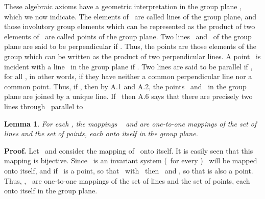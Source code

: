 \documentclass[a4paper,twoside,12pt]{article}
\newtheorem{lemma}{Lemma}[section]
\newenvironment{proof}{\medskip \noindent 
            {\bf Proof.}}{ \hfill \myHighlight{$\square$}\coordHE{} \medskip}
\begin{document}
     These algebraic axioms have a geometric interpretation in the 
group plane \coordHE{}, which we now indicate.
The elements of \coordHE{}\ are called lines of the group plane, and
those involutory group elements which can be represented as the product of
two elements of \coordHE{}\ are called points of the group plane. Two
lines \coordHE{}\ and \coordHE{}\ of the group plane are said to be perpendicular if 
\coordHE{}. Thus, the points are those elements of the group which can 
be written as the product of two perpendicular lines. A point \coordHE{}\ is 
incident with a line \coordHE{}\ in the group plane if \coordHE{}. Two lines 
\coordHE{} are said to be parallel if \coordHE{}, for all \coordHE{},
in other words, if they have neither a common perpendicular line nor a 
common point. Thus, if \coordHE{}, then by A.1 and A.2, the
points \coordHE{}\ and \coordHE{}\ in the group plane are joined by a unique line. If \coordHE{}\ then A.6 says that there are precisely two lines through \coordHE{}\
parallel to \coordHE{}

\begin{lemma} For each \coordHE{}, the mappings 
\myHighlight{$\sigma_{a}:$}\coordHE{}\ \coordHE{} and 
\myHighlight{$\sigma_{\alpha }:P\longmapsto P^{\alpha }\equiv \alpha P\alpha^{-1}$}\coordHE{} 
are one-to-one mappings of the set of lines and the set of points, each 
onto itself in the group plane.
\end{lemma}

\begin{proof} Let \coordHE{}\ and consider the mapping 
\myHighlight{$\gamma \longmapsto \gamma ^{\alpha }\equiv \alpha \gamma \alpha^{-1}$}\coordHE{} of 
\myHighlight{$\mathfrak{G}$}\coordHE{}\ onto itself. It is easily seen that this mapping is
bijective. Since \myHighlight{$\mathcal{G}$}\coordHE{}\ is an invariant system (\myHighlight{$a^{b}\in \mathcal{G}
$}\coordHE{}\ for every \myHighlight{$a\in \mathcal{G}, b \in \mathfrak{G}$}\coordHE{}) \myHighlight{$\mathcal{G}$}\coordHE{}\ will 
be mapped onto
itself, and if \coordHE{}\ is a point, so that \coordHE{}\ with \coordHE{}\ then 
\myHighlight{$P^{\alpha}=g^{\alpha }h^{\alpha }$}\coordHE{}\ and \myHighlight{$g^{\alpha }|h^{\alpha }$}\coordHE{}, so that 
\myHighlight{$P^{\alpha }$}\coordHE{} is also a point. Thus, \myHighlight{$g\longmapsto g^{\alpha }$}\coordHE{}, 
\myHighlight{$P\longmapsto P^{\alpha }$}\coordHE{}\ are one-to-one mappings of the set of lines and
the set of points, each onto itself in the group plane.
\end{proof}
\end{document}
